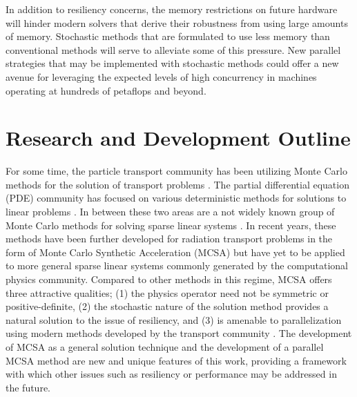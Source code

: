In addition to resiliency concerns, the memory restrictions on future
hardware will hinder modern solvers that derive their robustness from
using large amounts of memory. Stochastic methods that are formulated
to use less memory than conventional methods will serve to alleviate
some of this pressure. New parallel strategies that may
be implemented with stochastic methods could offer a new avenue for
leveraging the expected levels of high concurrency in machines
operating at hundreds of petaflops and beyond.

\section{Research and Development Outline}
\label{sec:research_outline}
For some time, the particle transport community has been utilizing
Monte Carlo methods for the solution of transport problems
\cite{lewis_computational_1993}. The partial differential equation
(PDE) community has focused on various deterministic methods for
solutions to linear problems \cite{saad_iterative_2003,
  kelley_iterative_1995}. In between these two areas are a not widely
known group of Monte Carlo methods for solving sparse linear systems
\cite{forsythe_matrix_1950, hammersley_monte_1964,
  halton_sequential_1962, halton_sequential_1994}. In recent years,
these methods have been further developed for radiation transport
problems in the form of Monte Carlo Synthetic Acceleration (MCSA)
\cite{evans_monte_2009, evans_monte_2012} but have yet to be applied
to more general sparse linear systems commonly generated by the
computational physics community. Compared to other methods in this
regime, MCSA offers three attractive qualities; (1) the physics
operator need not be symmetric or positive-definite, (2) the
stochastic nature of the solution method provides a natural solution
to the issue of resiliency, and (3) is amenable to parallelization
using modern methods developed by the transport community
\cite{wagner_hybrid_2010}. The development of MCSA as a general
solution technique and the development of a parallel MCSA method are
new and unique features of this work, providing a framework with which
other issues such as resiliency or performance may be addressed in the
future.

